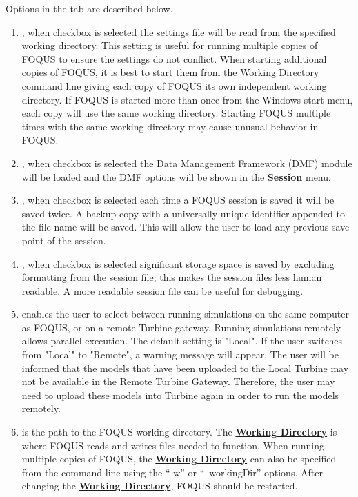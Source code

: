 Options in the  tab are described below.
\begin{enumerate}
	\item  {}, when checkbox is selected the settings file will be read from the specified working directory. This setting is useful for running multiple copies of FOQUS to ensure the settings do not conflict. When starting additional copies of FOQUS, it is best to start them from the Working Directory command line giving each copy of FOQUS its own independent working directory. If FOQUS is started more than once from the Windows start menu, each copy will use the same working directory. Starting FOQUS multiple times with the same working directory may cause unusual behavior in FOQUS.
	\item {}, when checkbox is selected the Data Management Framework (DMF) module will be loaded and the DMF options will be shown in the \textbf{Session\underline{}} menu.
	\item {}, when checkbox is selected each time a FOQUS session is saved it will be saved twice. A backup copy with a universally unique identifier appended to the file name will be saved.  This will allow the user to load any previous save point of the session.
	\item {}, when checkbox is selected significant storage space is saved by excluding formatting from the session file; this makes the session files less human readable. A more readable session file can be useful for debugging.
	\item {} enables the user to select between running simulations on the same computer as FOQUS, or on a remote Turbine gateway. Running simulations remotely allows parallel execution. The default setting is "Local". If the user switches from "Local" to "Remote", a warning message will appear. The user will be informed that the models that have been uploaded to the Local Turbine may not be available in the Remote Turbine Gateway. Therefore, the user may need to upload these models into Turbine again in order to run the models remotely.
	\item {} is the path to the FOQUS working directory. The \textbf{\underline{Working Directory}} is where FOQUS reads and writes files needed to function. When running multiple copies of FOQUS, the \textbf{\underline{Working Directory}} can also be specified from the command line using the ``-w'' or ``--workingDir'' options. After changing the \textbf{\underline{Working Directory}}, FOQUS should be restarted.

\end{enumerate}
